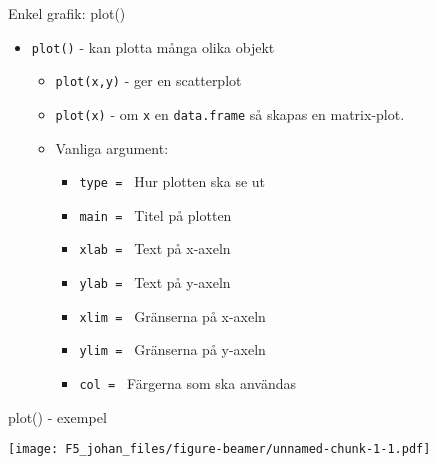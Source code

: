 \documentclass[
  11pt,
  ignorenonframetext,
  handout]{beamer}
\newenvironment{Shaded}{\begin{snugshade}}{\end{snugshade}}
\newcommand{\AttributeTok}[1]{\textcolor[rgb]{0.77,0.63,0.00}{#1}}
\newcommand{\FunctionTok}[1]{\textcolor[rgb]{0.00,0.00,0.00}{#1}}
\newcommand{\NormalTok}[1]{#1}
\newcommand{\SpecialCharTok}[1]{\textcolor[rgb]{0.00,0.00,0.00}{#1}}
\newcommand{\StringTok}[1]{\textcolor[rgb]{0.31,0.60,0.02}{#1}}
\providecommand{\tightlist}{%
  \setlength{\itemsep}{0pt}\setlength{\parskip}{0pt}}
\begin{document}
\begin{frame}{Enkel grafik: plot()}
\protect\hypertarget{enkel-grafik-plot}{}
\begin{itemize}
\tightlist
\item
  \texttt{plot()} - kan plotta många olika objekt

  \begin{itemize}
  \tightlist
  \item
    \texttt{plot(x,y)} - ger en scatterplot
  \item
    \texttt{plot(x)} - om \texttt{x} en \texttt{data.frame} så skapas en
    matrix-plot.
  \item
    Vanliga argument:

    \begin{itemize}
    \tightlist
    \item
      \texttt{type = } Hur plotten ska se ut
    \item
      \texttt{main = } Titel på plotten
    \item
      \texttt{xlab = } Text på x-axeln
    \item
      \texttt{ylab = } Text på y-axeln
    \item
      \texttt{xlim = } Gränserna på x-axeln
    \item
      \texttt{ylim = } Gränserna på y-axeln
    \item
      \texttt{col = } Färgerna som ska användas
    \end{itemize}
  \end{itemize}
\end{itemize}
\end{frame}

\begin{frame}[fragile]{plot() - exempel}
\protect\hypertarget{plot---exempel}{}
\begin{Shaded}
\end{Shaded}

\texttt{[image: F5\_johan\_files/figure-beamer/unnamed-chunk-1-1.pdf]}
\end{frame}
\end{document}
